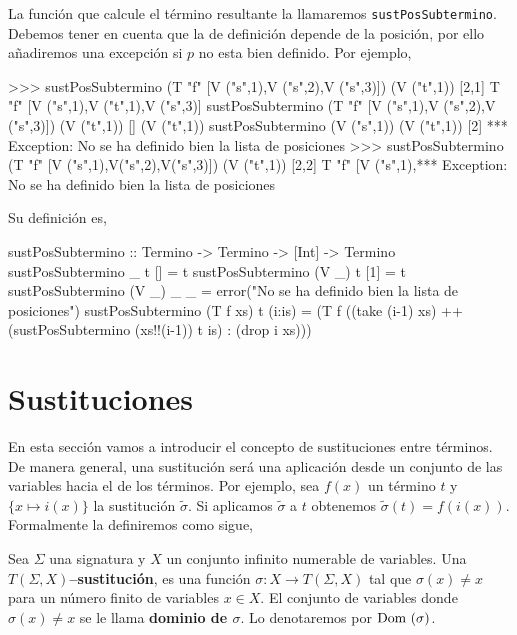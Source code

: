 La función que calcule el término resultante la llamaremos
\texttt{sustPosSubtermino}. Debemos tener en cuenta que la de
definición depende de la posición, por ello añadiremos una excepción
si $p$ no esta bien definido. Por ejemplo,

\begin{sesion}
>>> sustPosSubtermino (T "f" [V ("s",1),V ("s",2),V ("s",3)]) 
                        (V ("t",1)) [2,1]
T "f" [V ("s",1),V ("t",1),V ("s",3)]
sustPosSubtermino (T "f" [V ("s",1),V ("s",2),V ("s",3)]) 
                  (V ("t",1)) []
(V ("t",1))
sustPosSubtermino (V ("s",1)) (V ("t",1)) [2]
*** Exception: No se ha definido bien la lista de posiciones
>>> sustPosSubtermino (T "f" [V ("s",1),V("s",2),V("s",3)]) 
                        (V ("t",1)) [2,2]
T "f" [V ("s",1),*** Exception: No se ha definido bien la 
                     lista de posiciones
\end{sesion}

Su definición es,

\begin{codigo}
sustPosSubtermino :: Termino -> Termino -> [Int] -> Termino
sustPosSubtermino _ t [] = t
sustPosSubtermino (V _) t [1] = t
sustPosSubtermino (V _) _ _ = error("No se ha definido bien la 
                                     lista de posiciones")
sustPosSubtermino (T f xs) t (i:is) = (T f
    ((take (i-1) xs) ++
    (sustPosSubtermino (xs!!(i-1)) t is) :
    (drop i xs)))
\end{codigo}

\section {Sustituciones}

En esta sección vamos a introducir el concepto de sustituciones entre
términos. De manera general, una sustitución será una aplicación desde
un conjunto de las variables hacia el de los términos. Por ejemplo,
sea $f(x)$ un término $t$ y $\{x \mapsto i(x) \}$ la sustitución
$\tilde{\sigma}$. Si aplicamos $\tilde{\sigma}$ a $t$ obtenemos
$\tilde{\sigma}(t) = f(i(x))$. Formalmente la definiremos como sigue,

\begin{defi} 
  Sea $\Sigma$ una signatura y $X$ un conjunto infinito numerable de
  variables. Una \textbf{$T(\Sigma, X)$--sustitución}, es una función
  $\sigma : X \rightarrow T(\Sigma, X)$ tal que $\sigma(x) \neq x$
  para un número finito de variables $x \in X$. El conjunto de
  variables donde $\sigma(x) \neq x$ se le llama \textbf{dominio de
  $\sigma$}. Lo denotaremos por $\mbox{Dom } (\sigma)$.
\end{defi}

